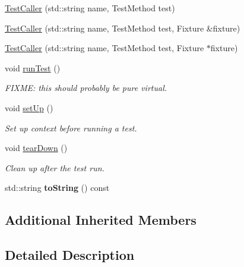\begin{DoxyCompactItemize}
\item 
\hyperlink{class_test_caller_a84cb35144455c4245c45d755b84c6093}{Test\+Caller} (std\+::string name, Test\+Method test)
\item 
\hyperlink{class_test_caller_a21479de59b7c38a6d8bed9e66025ebb0}{Test\+Caller} (std\+::string name, Test\+Method test, Fixture \&fixture)
\item 
\hyperlink{class_test_caller_a5977f4de9736929451f30b039a42487d}{Test\+Caller} (std\+::string name, Test\+Method test, Fixture $\ast$fixture)
\item 
void \hyperlink{class_test_caller_aad0c877a47b75d056a4f8f323d3169ab}{run\+Test} ()
\begin{DoxyCompactList}\small\item\em F\+I\+X\+M\+E\+: this should probably be pure virtual. \end{DoxyCompactList}\item 
\hypertarget{class_test_caller_ae6880afc711d24ae0b8846759064ceea}{void \hyperlink{class_test_caller_ae6880afc711d24ae0b8846759064ceea}{set\+Up} ()}\label{class_test_caller_ae6880afc711d24ae0b8846759064ceea}

\begin{DoxyCompactList}\small\item\em Set up context before running a test. \end{DoxyCompactList}\item 
\hypertarget{class_test_caller_a0e463b88bf0ceacbd8875e0450ed2649}{void \hyperlink{class_test_caller_a0e463b88bf0ceacbd8875e0450ed2649}{tear\+Down} ()}\label{class_test_caller_a0e463b88bf0ceacbd8875e0450ed2649}

\begin{DoxyCompactList}\small\item\em Clean up after the test run. \end{DoxyCompactList}\item 
\hypertarget{class_test_caller_a55f4f93fc657acb8c1dd500923a4bd1f}{std\+::string {\bfseries to\+String} () const }\label{class_test_caller_a55f4f93fc657acb8c1dd500923a4bd1f}

\end{DoxyCompactItemize}
\subsection*{Additional Inherited Members}


\subsection{Detailed Description}
